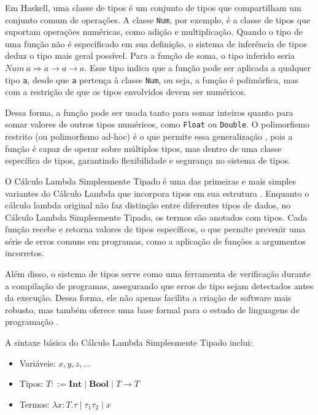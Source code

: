 Em Haskell, uma classe de tipos é um conjunto de tipos que compartilham um conjunto comum de operações.
A classe \texttt{Num}, por exemplo, é a classe de tipos que suportam operações numéricas, como adição e multiplicação.
Quando o tipo de uma função não é especificado em sua definição, o sistema de inferência de tipos deduz o tipo mais geral possível.
Para a função de soma, o tipo inferido seria $Num\ a \Rightarrow a \rightarrow a \rightarrow a$.
Esse tipo indica que a função pode ser aplicada a qualquer tipo \texttt{a}, desde que \texttt{a} pertença à classe \texttt{Num}, ou seja, a função é polimórfica, mas com a restrição de que os tipos envolvidos devem ser numéricos.

Dessa forma, a função pode ser usada tanto para somar inteiros quanto para somar valores de outros tipos numéricos, como \texttt{Float} ou \texttt{Double}.
O polimorfismo restrito (ou polimorfismo ad-hoc) é o que permite essa generalização \cite{PIERCE2002}, pois a função é capaz de operar sobre múltiplos tipos, mas dentro de uma classe específica de tipos, garantindo flexibilidade e segurança no sistema de tipos.

O Cálculo Lambda Simplesmente Tipado é uma das primeiras e mais simples variantes do Cálculo Lambda que incorpora tipos em sua estrutura \cite{CHURCH1940}.
Enquanto o cálculo lambda original não faz distinção entre diferentes tipos de dados, no Cálculo Lambda Simplesmente Tipado, os termos são anotados com tipos.
Cada função recebe e retorna valores de tipos específicos, o que permite prevenir uma série de erros comuns em programas, como a aplicação de funções a argumentos incorretos.

Além disso, o sistema de tipos serve como uma ferramenta de verificação durante a compilação de programas, assegurando que erros de tipo sejam detectados antes da execução.
Dessa forma, ele não apenas facilita a criação de software mais robusto, mas também oferece uma base formal para o estudo de linguagens de programação \cite{PIERCE2002}.

A sintaxe básica do Cálculo Lambda Simplesmente Tipado inclui:

\begin{itemize}
  \item Variáveis: $x, y, z, ...$
  \item Tipos: $T ::= \mathbf{Int} \mid \mathbf{Bool} \mid T \to T$
  \item Termos: $\lambda x:T. \tau \mid \tau_1 \tau_2 \mid x$
\end{itemize}


